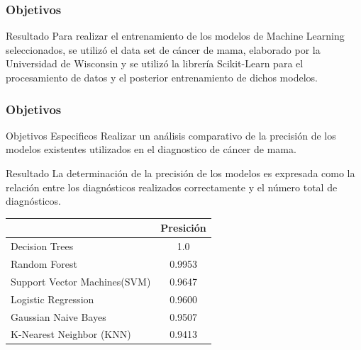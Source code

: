 \documentclass[xcolor=dvipsnames,xcolor=table]{beamer} %
\begin{document}
\begin{frame}
	\frametitle{Objetivos}
	\begin{alertblock} {Resultado}
		\justifying
		Para realizar el entrenamiento de los modelos de Machine Learning seleccionados, se utilizó el data set  de cáncer de mama, elaborado por la Universidad de Wisconsin y se utilizó la librería Scikit-Learn para el  procesamiento de datos  y el posterior entrenamiento de dichos modelos. 
	\end{alertblock}
\end{frame}

\begin{frame}
	\frametitle{Objetivos}
	\begin{block}{Objetivos Especificos}\justifying
		Realizar un análisis comparativo de la precisión de los modelos existentes utilizados en el diagnostico de cáncer de mama.	
	\end{block}
	
	\begin{alertblock}{Resultado}
		\justifying	
		La determinación de la precisión de los modelos es expresada como la relación entre los diagnósticos realizados correctamente y el número total de diagnósticos. 
	\end{alertblock}
	
	\begin{table}[ht]
		\begin{center}	
			\begin{tabular}{lc}
				\hline
				\rowcolor[HTML]{DADADA} 
				\multicolumn{1}{c}{\cellcolor[HTML]{DADADA}\textbf{Modelo}} & \textbf{Presición} \\ \hline
				Decision Trees                                              & 1.0                \\ \hline
				Random Forest                                               & 0.9953             \\ \hline
				Support Vector Machines(SVM)                                & 0.9647             \\ \hline
				Logistic Regression                                         & 0.9600             \\ \hline
				Gaussian Naive Bayes                                        & 0.9507             \\ \hline
				K-Nearest Neighbor (KNN)                                    & 0.9413             \\ \hline
			\end{tabular}
		\end{center}
	\end{table}
\end{frame}
\end{document}
